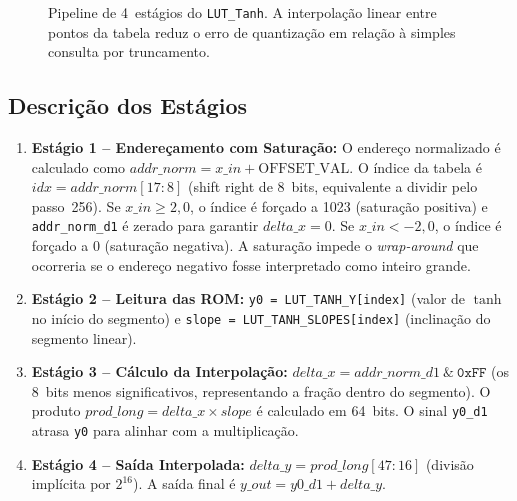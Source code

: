 \documentclass[a4paper,12pt]{article}
\begin{document}
\begin{figure}[H]
\caption{Pipeline de 4~est\'agios do \texttt{LUT\_Tanh}. A interpola\c{c}\~ao linear entre pontos da tabela reduz o erro de quantiza\c{c}\~ao em rela\c{c}\~ao \`a simples consulta por truncamento.}
\label{fig:pipeline_tanh}
\end{figure}

\subsection{Descri\c{c}\~ao dos Est\'agios}

\begin{enumerate}
    \item \textbf{Est\'agio 1 -- Endere\c{c}amento com Satura\c{c}\~ao:}
    O endere\c{c}o normalizado \'e calculado como $addr\_norm = x\_in + \text{OFFSET\_VAL}$. O \'indice da tabela \'e $idx = addr\_norm[17\!:\!8]$ (shift right de 8~bits, equivalente a dividir pelo passo~256). Se $x\_in \ge 2{,}0$, o \'indice \'e for\c{c}ado a 1023 (satura\c{c}\~ao positiva) e \texttt{addr\_norm\_d1} \'e zerado para garantir $delta\_x = 0$. Se $x\_in < -2{,}0$, o \'indice \'e for\c{c}ado a 0 (satura\c{c}\~ao negativa). A satura\c{c}\~ao impede o \textit{wrap-around} que ocorreria se o endere\c{c}o negativo fosse interpretado como inteiro grande.

    \item \textbf{Est\'agio 2 -- Leitura das ROM:}
    \texttt{y0 = LUT\_TANH\_Y[index]} (valor de $\tanh$ no in\'icio do segmento) e \texttt{slope = LUT\_TANH\_SLOPES[index]} (inclina\c{c}\~ao do segmento linear).

    \item \textbf{Est\'agio 3 -- C\'alculo da Interpola\c{c}\~ao:}
    $delta\_x = addr\_norm\_d1\ \&\ \texttt{0xFF}$ (os 8~bits menos significativos, representando a fra\c{c}\~ao dentro do segmento). O produto $prod\_long = delta\_x \times slope$ \'e calculado em 64~bits. O sinal \texttt{y0\_d1} atrasa \texttt{y0} para alinhar com a multiplica\c{c}\~ao.

    \item \textbf{Est\'agio 4 -- Sa\'ida Interpolada:}
    $delta\_y = prod\_long[47\!:\!16]$ (divis\~ao impl\'icita por $2^{16}$). A sa\'ida final \'e $y\_out = y0\_d1 + delta\_y$.
\end{enumerate}
\end{document}
